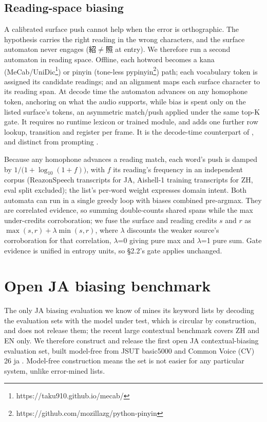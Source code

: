 \documentclass{article}
\begin{document}
\subsection{Reading-space biasing}
A calibrated surface push cannot help when the error is orthographic. The hypothesis carries the right reading in the wrong characters, and the surface automaton never engages (紹$\neq$照 at entry). We therefore run a second automaton in reading space. Offline, each hotword becomes a kana (MeCab/UniDic\footnote{https://taku910.github.io/mecab/}) or pinyin (tone-less pypinyin\footnote{https://github.com/mozillazg/python-pinyin}) path; each vocabulary token is assigned its candidate readings; and an alignment maps each surface character to its reading span. At decode time the automaton advances on any homophone token, anchoring on what the audio supports, while bias is spent only on the listed surface's tokens, an asymmetric match/push applied under the same top-K gate. It requires no runtime lexicon or trained module, and adds one further row lookup, transition and register per frame. It is the decode-time counterpart of \cite{bruguier2019phoebe,chen2019joint}, and distinct from prompting \cite{peng24b_interspeech}.

Because any homophone advances a reading match, each word's push is damped by $1/\bigl(1 + \log_{10}(1+f)\bigr)$, with $f$ its reading's
frequency in an independent corpus (ReazonSpeech transcripts \cite{yin2023reazonspeech} for JA, Aishell-1 training transcripts \cite{bu2017aishell} for ZH, eval split excluded); the list's per-word weight expresses domain intent. Both automata can run in a single greedy loop with biases combined pre-argmax. They are correlated evidence, so summing double-counts shared spans while the max under-credits corroboration; we fuse the surface and reading credits $s$ and $r$ as $\max(s,r) + \lambda \min(s,r)$, where $\lambda$ discounts the weaker source's corroboration for that correlation, $\lambda$=0 giving pure max and $\lambda$=1 pure sum. Gate evidence is unified in entropy units, so §2.2's gate applies unchanged.


\section{Open JA biasing benchmark}




The only JA biasing evaluation we know of \cite{nakagome25_interspeech} mines its keyword lists by decoding the evaluation sets with the model under test, which is circular by construction, and does not release them; the recent large contextual benchmark \cite{wang2025contextasr} covers ZH and EN only. We therefore construct and release the first open JA contextual-biasing evaluation set, built model-free from JSUT basic5000 \cite{sonobe2017jsut} and Common Voice (CV) 26 ja \cite{ardila2020common}. Model-free construction means the set is not easier for any particular system, unlike error-mined lists. 
\end{document}

